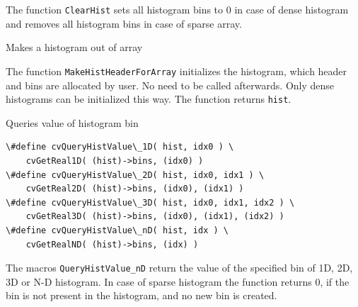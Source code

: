 The function \texttt{ClearHist} sets all histogram bins to 0 in case of dense histogram and removes all histogram bins in case of sparse array.

\label{MakeHistHeaderForArray}

Makes a histogram out of array


\begin{description}
\end{description}

The function \texttt{MakeHistHeaderForArray} initializes the histogram, which header and bins are allocated by user. No  need to be called afterwards. Only dense histograms can be initialized this way. The function returns \texttt{hist}.

\label{QueryHistValue_nD}

Queries value of histogram bin

\begin{lstlisting}
\#define cvQueryHistValue\_1D( hist, idx0 ) \
    cvGetReal1D( (hist)->bins, (idx0) )
\#define cvQueryHistValue\_2D( hist, idx0, idx1 ) \
    cvGetReal2D( (hist)->bins, (idx0), (idx1) )
\#define cvQueryHistValue\_3D( hist, idx0, idx1, idx2 ) \
    cvGetReal3D( (hist)->bins, (idx0), (idx1), (idx2) )
\#define cvQueryHistValue\_nD( hist, idx ) \
    cvGetRealND( (hist)->bins, (idx) )
\end{lstlisting}

\begin{description}
\cvarg{ hist}{Histogram}
\end{description}

The macros \texttt{QueryHistValue\_nD} return the value of the specified bin of 1D, 2D, 3D or N-D histogram. In case of sparse histogram the function returns 0, if the bin is not present in the histogram, and no new bin is created.

